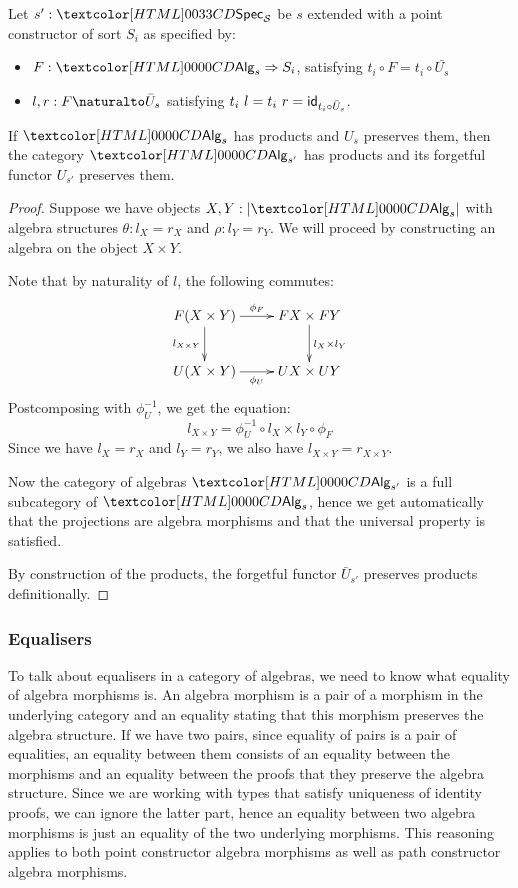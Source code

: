 \begin{lemma}
  Let $s' : \specty_\Ss$ be $s$ extended with a point constructor of sort
  $S_i$ as specified by:
  \begin{itemize}
  \item $F : \Func{\Alg_s}{S_i}$, satisfying $t_i \circ F = t_i \circ \bar{U_s}$
  \item $l, r : \Nat{F}{\bar{U}_s}$ satisfying
    $t_i\ l = t_i\ r = \id_{t_i \circ \bar{U}_s}$.
  \end{itemize}

  If $\Alg_s$ has products and $U_s$ preserves them, then the category
  $\Alg_{s'}$ has products and its forgetful functor $U_{s'}$
  preserves them.
\end{lemma}

\begin{proof}
  Suppose we have objects $X, Y : | \Alg_s |$ with algebra structures
  $\theta : l_X = r_X$ and $\rho : l_Y = r_Y$. We will proceed by
  constructing an algebra on the object $X \times Y$.

  Note that by naturality of $l$, the following commutes:
  $$
  \xymatrix{
    F(X \times Y) \ar[r]^{\phi_F} \ar[d]_{l_{X \times Y}} &FX \times FY \ar[d]^{l_X \times l_Y} \\
    U(X \times Y) \ar[r]_{\phi_U} &UX \times UY
  }
  $$
  Postcomposing with $\phi_U^{-1}$, we get the equation:
  $$
  l_{X \times Y} = \phi_U^{-1} \circ l_X \times l_Y \circ \phi_F
  $$
  Since we have $l_X = r_X$ and $l_Y = r_Y$, we also have
  $l_{X \times Y} = r_{X \times Y}$.

  Now the category of algebras $\Alg_{s'}$ is a full subcategory of
  $\Alg_s$, hence we get automatically that the projections are
  algebra morphisms and that the universal property is satisfied.

  By construction of the products, the forgetful functor
  $\bar{U}_{s'}$ preserves products definitionally.
\end{proof}

\subsubsection{Equalisers}

To talk about equalisers in a category of algebras, we need to know
what equality of algebra morphisms is. An algebra morphism is a pair
of a morphism in the underlying category and an equality stating that
this morphism preserves the algebra structure. If we have two pairs,
since equality of pairs is a pair of equalities, an equality between
them consists of an equality between the morphisms and an equality
between the proofs that they preserve the algebra structure. Since we
are working with types that satisfy uniqueness of identity proofs, we
can ignore the latter part, hence an equality between two algebra
morphisms is just an equality of the two underlying morphisms. This
reasoning applies to both point constructor algebra morphisms as well as
path constructor algebra morphisms.

